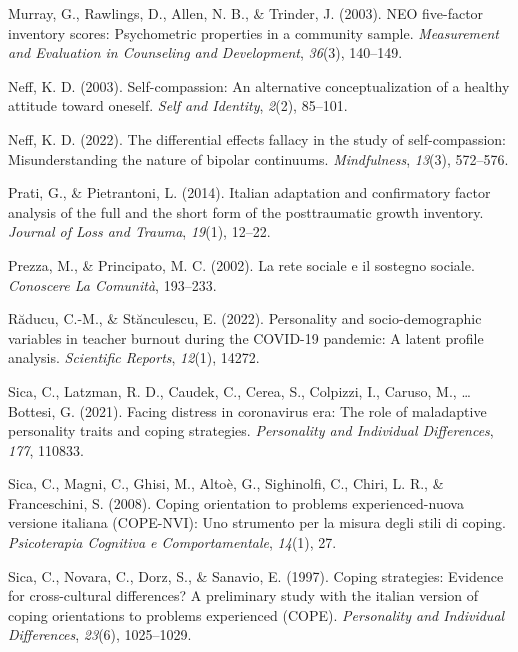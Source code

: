 \documentclass[
  man]{apa6}
\newlength{\cslhangindent}
\newlength{\cslentryspacingunit} %
\newenvironment{CSLReferences}[2] %
 {%
  \setlength{\parindent}{0pt}
  \ifodd #1
  \let\oldpar\par
  \def\par{\hangindent=\cslhangindent\oldpar}
  \fi
  \setlength{\parskip}{#2\cslentryspacingunit}
 }%
 {}
\begin{document}
\begin{CSLReferences}{1}{0}
\leavevmode{}%
Murray, G., Rawlings, D., Allen, N. B., \& Trinder, J. (2003). NEO five-factor inventory scores: Psychometric properties in a community sample. \emph{Measurement and Evaluation in Counseling and Development}, \emph{36}(3), 140--149.

\leavevmode{}%
Neff, K. D. (2003). Self-compassion: An alternative conceptualization of a healthy attitude toward oneself. \emph{Self and Identity}, \emph{2}(2), 85--101.

\leavevmode{}%
Neff, K. D. (2022). The differential effects fallacy in the study of self-compassion: Misunderstanding the nature of bipolar continuums. \emph{Mindfulness}, \emph{13}(3), 572--576.

\leavevmode{}%
Prati, G., \& Pietrantoni, L. (2014). Italian adaptation and confirmatory factor analysis of the full and the short form of the posttraumatic growth inventory. \emph{Journal of Loss and Trauma}, \emph{19}(1), 12--22.

\leavevmode{}%
Prezza, M., \& Principato, M. C. (2002). La rete sociale e il sostegno sociale. \emph{Conoscere La Comunit{à}}, 193--233.

\leavevmode{}%
Răducu, C.-M., \& Stănculescu, E. (2022). Personality and socio-demographic variables in teacher burnout during the COVID-19 pandemic: A latent profile analysis. \emph{Scientific Reports}, \emph{12}(1), 14272.

\leavevmode{}%
Sica, C., Latzman, R. D., Caudek, C., Cerea, S., Colpizzi, I., Caruso, M., \ldots{} Bottesi, G. (2021). Facing distress in coronavirus era: The role of maladaptive personality traits and coping strategies. \emph{Personality and Individual Differences}, \emph{177}, 110833.

\leavevmode{}%
Sica, C., Magni, C., Ghisi, M., Altoè, G., Sighinolfi, C., Chiri, L. R., \& Franceschini, S. (2008). Coping orientation to problems experienced-nuova versione italiana (COPE-NVI): Uno strumento per la misura degli stili di coping. \emph{Psicoterapia Cognitiva e Comportamentale}, \emph{14}(1), 27.

\leavevmode{}%
Sica, C., Novara, C., Dorz, S., \& Sanavio, E. (1997). Coping strategies: Evidence for cross-cultural differences? A preliminary study with the italian version of coping orientations to problems experienced (COPE). \emph{Personality and Individual Differences}, \emph{23}(6), 1025--1029.


\end{CSLReferences}
\end{document}
